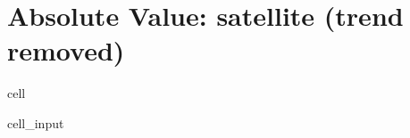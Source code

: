 \documentclass[letterpaper,10pt,english]{jupyterBook}
\begin{document}
\chapter{Absolute Value: satellite (trend removed)}
\label{\detokenize{notebooks/regional_and_local/SL_anomaly_intra-annual:absolute-value-satellite-trend-removed}}
\begin{sphinxuseclass}{cell}\begin{sphinxVerbatimInput}

\begin{sphinxuseclass}{cell_input}
\begin{sphinxVerbatim}[commandchars=\\\{\}]
    
\end{sphinxVerbatim}

\end{sphinxuseclass}\end{sphinxVerbatimInput}

\end{sphinxuseclass}
\end{document}
